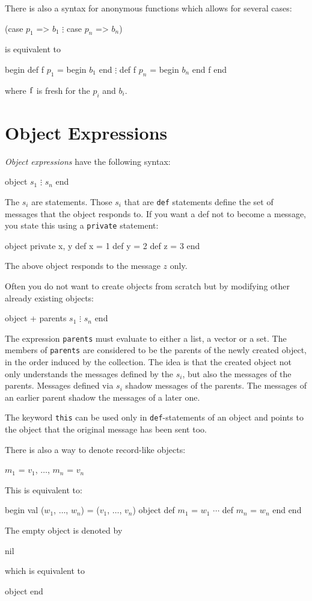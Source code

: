 \documentclass[11pt]{amsart}
\newcommand{\babelsrc}[1] {\lstinline!#1!}
\begin{document}
There is also a syntax for anonymous functions which allows for several cases:
\begin{babellisting}
(case $p_1$ => $b_1$
    $\vdots$
 case $p_n$ => $b_n$)
\end{babellisting}
is equivalent to 
\begin{babellisting}
begin
  def f $p_1$ = begin $b_1$ end
    $\vdots$
  def f $p_n$ = begin $b_n$ end
  f
end
\end{babellisting}
where $\babelsrc{f}$ is fresh for the $p_i$ and $b_i$.

\section{Object Expressions}
\emph{Object expressions} have the following syntax:
\begin{babellisting}
object 
  $s_1$
  $\vdots$
  $s_n$
end
\end{babellisting}
The $s_i$ are statements.  Those $s_i$ that are  \babelsrc{def} statements define the set of messages that the object responds to. If you want a def not to become a message, you state this using a \babelsrc{private} statement:
\begin{babellisting}
object 
  private x, y
  def x = 1
  def y = 2
  def z = 3
end
\end{babellisting}
The above object responds to the message $z$ only.

Often you do not want to create objects from scratch but by modifying other already existing objects:
\begin{babellisting}
object + parents
  $s_1$
  $\vdots$
  $s_n$
end
\end{babellisting}
The expression \babelsrc{parents} must evaluate to either a list, a vector or a set. The members of  \babelsrc{parents}
are considered to be the parents of the newly created object, in the order induced by the collection. The idea is that the created object not only understands the messages defined by the $s_i$, but also the messages of the parents. Messages defined via $s_i$ shadow messages of the parents. The messages of an earlier parent shadow the messages of a later one. 

The keyword \babelsrc{this} can be used only in \babelsrc{def}-statements of an object and points to the object that the original message has been sent too.

\noindent There is also a way to denote record-like objects:
\begin{babellisting}
{ $m_1$ = $v_1$, $\ldots$, $m_n$ = $v_n$ }
\end{babellisting}
This is equivalent to:
\begin{babellisting}
begin
  val ($w_1$, $\ldots$, $w_n$) = ($v_1$, $\ldots$, $v_n$)
  object
    def $m_1$ = $w_1$
    $\cdots$
    def $m_n$ = $w_n$
  end
end
\end{babellisting}
The empty object is denoted by
\begin{babellisting}
nil
\end{babellisting}
which is equivalent to
\begin{babellisting}
object end
\end{babellisting}
\end{document}
